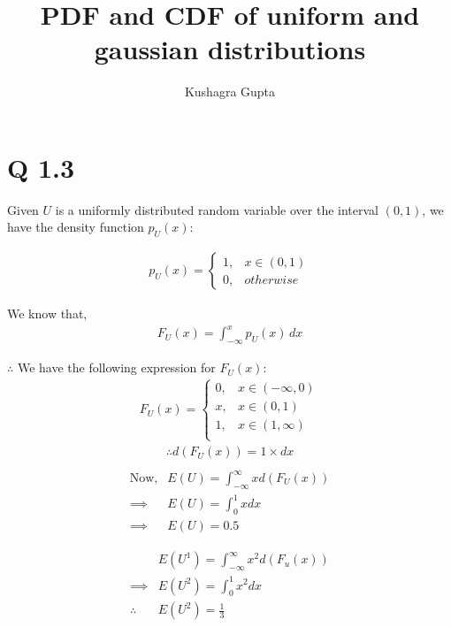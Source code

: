 \documentclass[journal,12pt,twocolumn]{IEEEtran}
\title{PDF and CDF of uniform and gaussian distributions}
\author{Kushagra Gupta}
\date{}
\begin{document}
\maketitle

\section{Q 1.3}
\noindent Given $U$ is a uniformly distributed random variable over the interval $(0, 1)$, we have the density function $p_U(x)$:

\begin{align}
	p_U(x) =
            \begin{cases}
    		1, & x \in (0, 1) \\
    		0, & otherwise
	    \end{cases}
    	\label{eq:PDF}
\end{align}

We know that,
\begin{align}
    F_U(x) = \int_{-\infty}^{x} p_U(x) \,dx
    \label{eq:Relation}
\end{align}

\noindent $\therefore$ We have the following expression for $F_U(x)$:
\begin{align}
    F_U(x) =
	    \begin{cases}
	    	0, & x \in (-\infty, 0) \\
  	    	x, & x \in (0, 1) \\
    		1, & x \in (1, \infty)\\
            \end{cases}
\end{align}
\begin{align}
    \therefore d(F_U(x)) = 1 \times dx\\
\end{align}
\begin{align}
    \text{Now,}&E(U) = \int _ {-\infty} ^ {\infty} {x d(F_U(x))}\\
    \implies &E(U) = \int _ {0} ^ {1} {x dx}\\
    \implies &E(U) = 0.5
\end{align}

\begin{align}
    &E(U^1) = \int _ {- \infty} ^ {\infty} {x^2 d(F_u(x))} \\
    \implies &E(U^2) = \int _ {0} ^ {1} {x^2 dx} \\
    \therefore &E(U^2) = \frac{1}{3}
\end{align}
\end{document}
